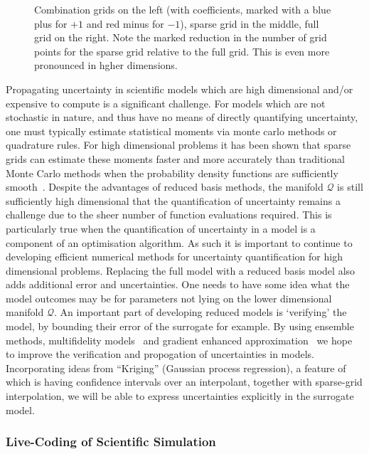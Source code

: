 \documentclass[a4paper,fontsize=12pt]{scrartcl}
\begin{document}
\begin{figure}
  \centering
    
  \caption{Combination grids on the left (with coefficients, marked with
    a blue plus for $+1$ and red minus for $-1$), sparse grid in the
    middle, full grid on the right. Note the marked reduction in the number of 
    grid points for the sparse grid relative to the full grid. 
   This is even more pronounced in hgher dimensions.}
  \label{fig:sparse_grids}
\end{figure}

Propagating uncertainty in scientific models which are high
dimensional and/or expensive to compute is a significant challenge.
For models which are not stochastic in nature, and thus have no means
of directly quantifying uncertainty, one must typically estimate
statistical moments via monte carlo methods or quadrature rules. For
high dimensional problems it has been shown that sparse grids can
estimate these moments faster and more accurately than traditional
Monte Carlo methods when the probability density functions are
sufficiently
smooth~\parencite{JakemanRoberts2013,FranzelinDiehlPfluger2014}.
Despite the advantages of reduced basis methods, the manifold
$\mathcal{Q}$ is still sufficiently high dimensional that the
quantification of uncertainty remains a challenge due to the sheer
number of function evaluations required. This is particularly true
when the quantification of uncertainty in a model is a component of an
optimisation algorithm. As such it is important to continue to
developing efficient numerical methods for uncertainty quantification
for high dimensional problems. Replacing the full model with a reduced
basis model also adds additional error and uncertainties. One needs to
have some idea what the model outcomes may be for parameters not lying
on the lower dimensional manifold $\mathcal{Q}$. An important part of
developing reduced models is `verifying' the model, by bounding their
error of the surrogate for example. By using ensemble methods,
multifidelity models~\parencite{NgWillcox2014} and gradient enhanced
approximation~\parencite{deBaarHarding2015,Jakeman2015} we hope to
improve the verification and propogation of uncertainties in models.
Incorporating ideas from ``Kriging'' (Gaussian process regression), a
feature of which is having confidence intervals over an interpolant,
together with sparse-grid interpolation, we will be able to express
uncertainties explicitly in the surrogate model.


\subsubsection*{Live-Coding of Scientific Simulation}
\end{document}
